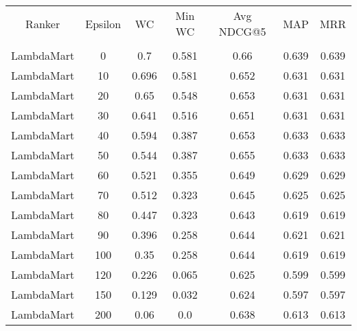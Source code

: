 \begin{longtable}{*{7}{c}}
Ranker & Epsilon & WC & Min WC & Avg NDCG@5 & MAP & MRR  \\\\ 
LambdaMart & 0 & 0.7 & 0.581 & 0.66 & 0.639 & 0.639 \\ 
LambdaMart & 10 & 0.696 & 0.581 & 0.652 & 0.631 & 0.631 \\ 
LambdaMart & 20 & 0.65 & 0.548 & 0.653 & 0.631 & 0.631 \\ 
LambdaMart & 30 & 0.641 & 0.516 & 0.651 & 0.631 & 0.631 \\ 
LambdaMart & 40 & 0.594 & 0.387 & 0.653 & 0.633 & 0.633 \\ 
LambdaMart & 50 & 0.544 & 0.387 & 0.655 & 0.633 & 0.633 \\ 
LambdaMart & 60 & 0.521 & 0.355 & 0.649 & 0.629 & 0.629 \\ 
LambdaMart & 70 & 0.512 & 0.323 & 0.645 & 0.625 & 0.625 \\ 
LambdaMart & 80 & 0.447 & 0.323 & 0.643 & 0.619 & 0.619 \\ 
LambdaMart & 90 & 0.396 & 0.258 & 0.644 & 0.621 & 0.621 \\ 
LambdaMart & 100 & 0.35 & 0.258 & 0.644 & 0.619 & 0.619 \\ 
LambdaMart & 120 & 0.226 & 0.065 & 0.625 & 0.599 & 0.599 \\ 
LambdaMart & 150 & 0.129 & 0.032 & 0.624 & 0.597 & 0.597 \\ 
LambdaMart & 200 & 0.06 & 0.0 & 0.638 & 0.613 & 0.613 \\ 
\end{longtable}
